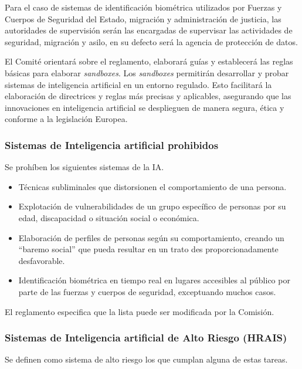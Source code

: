 Para el caso de sistemas de identificación biométrica utilizados por Fuerzas y Cuerpos de Seguridad del Estado, migración y administración de justicia, las autoridades de supervisión serán las encargadas de supervisar las actividades de seguridad, migración y asilo, en su defecto será la agencia de protección de datos. 

El Comité orientará sobre el reglamento, elaborará guías y establecerá las reglas básicas para elaborar \textit{sandboxes}. Los \textit{sandboxes} permitirán desarrollar y probar sistemas de inteligencia artificial en un entorno regulado. Esto facilitará la elaboración de directrices y reglas más precisas y aplicables, asegurando que las innovaciones en inteligencia artificial se desplieguen de manera segura, ética y conforme a la legislación Europea.

\subsubsection{Sistemas de Inteligencia artificial prohibidos}

Se prohíben los siguientes sistemas de la \acrfull{IA}.

\begin{itemize}
    \item Técnicas subliminales que distorsionen el comportamiento de una persona.
    \item Explotación de vulnerabilidades de un grupo específico de personas por su edad, discapacidad o situación social o económica.
    \item Elaboración de perfiles de personas según su comportamiento, creando un ``baremo social'' que pueda resultar en un trato  des proporcionadamente desfavorable.
    \item Identificación biométrica en tiempo real en lugares accesibles al público por parte de las fuerzas y cuerpos de seguridad, exceptuando muchos casos.
\end{itemize}

El reglamento especifica que la lista puede ser modificada por la Comisión.

\subsubsection{Sistemas de Inteligencia artificial de Alto Riesgo (HRAIS)}

Se definen como sistema de alto riesgo los que cumplan alguna de estas tareas.

